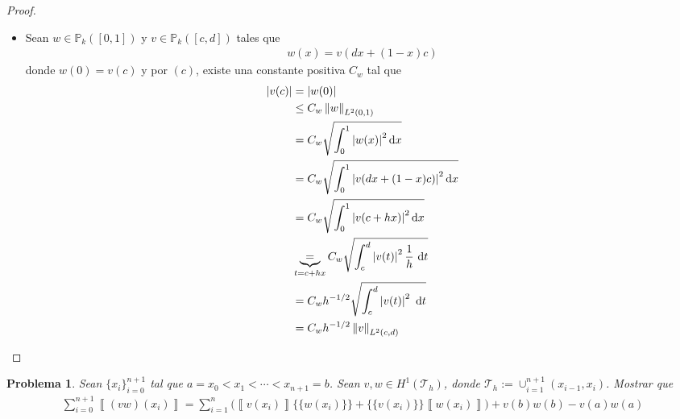 \documentclass[10pt,a4paper]{report}
\newtheorem{pro}{Problema}
\newcommand{\dx}{\textup{d}x}
\newcommand{\dt}{\textup{d}t}
\providecommand{\abs}[1]{\left\lvert#1\right\rvert}
\providecommand{\norm}[1]{\left\lVert#1\right\rVert}
\providecommand{\salto}[1]{\left\llbracket#1\right\rrbracket}
\providecommand{\prom}[1]{\{\!\{#1\}\!\}}
\begin{document}
\begin{proof}
\begin{itemize}
\begin{align*}
            \end{align*}
            así, por $(a)$ se tiene que para todo $v\in \mathbb{P}_{k}([0,1])$
            \begin{align*}
            	\exists C>0: \ \abs{v(0)} \leq C\norm{v}_{H^{1}(0,1)} \leq C\beta \norm{v}_{L^{2}(0,1)} = \hat{C}\norm{v}_{L^{2}(0,1)}
            \end{align*}
            \item[$(c)$] Sean $w\in \mathbb{P}_{k}([0,1])$ y $v\in \mathbb{P}_{k}([c,d])$ tales que
            \begin{align*}
            	w(x) = v(dx + (1-x)c)
            \end{align*}
            donde $w(0) = v(c)$ y por $(c)$, existe una constante positiva $C_{w}$ tal que
            \begin{align*}
            	\abs{v(c)} &= \abs{w(0)}\\ &\leq C_{w}\norm{w}_{L^{2}(0,1)}\\ &= C_{w}\sqrt{\int_{0}^{1}\abs{w(x)}^{2}\dx}\\ &= C_{w}\sqrt{\int_{0}^{1}\abs{v(dx+(1-x)c)}^{2}\dx}\\ &= C_{w}\sqrt{\int_{0}^{1}\abs{v(c + hx)}^{2}\dx}  \\ 
            	&\underbrace{=}_{t = c + hx} C_{w} \sqrt{\int_{c}^{d}\abs{v(t)}^{2}\frac{1}{h}\ \dt}\\ &= C_{w}h^{-1/2}\sqrt{\int_{c}^{d}\abs{v(t)}^{2}\ \dt}\\ &= C_{w}h^{-1/2}\norm{v}_{L^{2}(c,d)}
            \end{align*}
    	\end{itemize}
    \end{proof}
    \begin{pro}
    	Sean $\{x_{i}\}_{i=0}^{n+1}$ tal que $a = x_0 < x_1 < \cdots < x_{n+1} = b$. Sean $v,w\in H^{1}(\mathcal{T}_{h})$, donde $\mathcal{T}_{h} := \cup^{n+1}_{i=1}(x_{i-1},x_{i})$. Mostrar que
    	\begin{align*}
    		\sum_{i=0}^{n+1} \salto{(vw)(x_{i})} = \sum_{i=1}^{n}\Big( \salto{v(x_{i})}\prom{w(x_{i})} + \prom{v(x_{i})}\salto{w(x_{i})}\Big) + v(b)w(b) - v(a)w(a)
    	\end{align*} 
    \end{pro}
\end{document}
